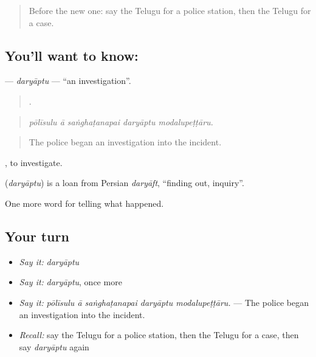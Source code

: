 \label{lesson:TE-C333-daryaptu}



\begin{quote}
Before the new one: say the Telugu for a police station, then the Telugu for a case.
\end{quote}

\subsection*{You'll want to know: }
\textbf{} — \emph{daryāptu} — \textquotedblleft{}an investigation\textquotedblright{}.

\begin{quote}
    .
\end{quote}

\begin{quote}
\emph{pōlīsulu ā saṅghaṭanapai daryāptu modalupeṭṭāru.}
\end{quote}

\begin{quote}
The police began an investigation into the incident.
\end{quote}

 , to investigate.

\begin{cousinweb}
\textbf{} (\emph{daryāptu}) is a loan from Persian \emph{daryāft}, \textquotedblleft{}finding out, inquiry\textquotedblright{}.
\end{cousinweb}

\begin{grammarlens}[title={What you've built}]
One more word for telling what happened.
\end{grammarlens}

\subsection*{Your turn}
\begin{itemize}
\raggedright
  \item \emph{Say it:} \emph{daryāptu}
  \item \emph{Say it:} \emph{daryāptu}, once more
  \item \emph{Say it:} \emph{pōlīsulu ā saṅghaṭanapai daryāptu modalupeṭṭāru.} — The police began an investigation into the incident.
  \item \emph{Recall:} say the Telugu for a police station, then the Telugu for a case, then say \emph{daryāptu} again
\end{itemize}


